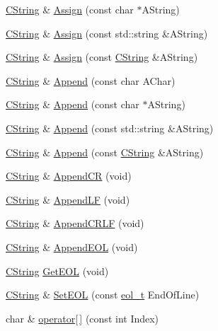 \begin{DoxyCompactItemize}
\item 
\hyperlink{classCString}{C\-String} \& \hyperlink{classCString_a962df2e6c15fdf8017d4bef0304135fd}{Assign} (const char $\ast$A\-String)
\item 
\hyperlink{classCString}{C\-String} \& \hyperlink{classCString_adf1310a3fd1e375b8d9a1ed66cace434}{Assign} (const std\-::string \&A\-String)
\item 
\hyperlink{classCString}{C\-String} \& \hyperlink{classCString_a9f4bad2bf3461011e060a539496149df}{Assign} (const \hyperlink{classCString}{C\-String} \&A\-String)
\item 
\hyperlink{classCString}{C\-String} \& \hyperlink{classCString_aea8e3277a78f2d12eaa1419b223d2e1e}{Append} (const char A\-Char)
\item 
\hyperlink{classCString}{C\-String} \& \hyperlink{classCString_aa163faa52f0615f3a4f6480c53d259b4}{Append} (const char $\ast$A\-String)
\item 
\hyperlink{classCString}{C\-String} \& \hyperlink{classCString_a184ae7089d40bbc8239586e1456ae56d}{Append} (const std\-::string \&A\-String)
\item 
\hyperlink{classCString}{C\-String} \& \hyperlink{classCString_aeb03518bdc70ff7dfeb96b1735ba8e0b}{Append} (const \hyperlink{classCString}{C\-String} \&A\-String)
\item 
\hyperlink{classCString}{C\-String} \& \hyperlink{classCString_a5747e10a27ef61a2daa94c1e6fe40a51}{Append\-C\-R} (void)
\item 
\hyperlink{classCString}{C\-String} \& \hyperlink{classCString_a841b1f0e113e1d186ea5c6312db814e0}{Append\-L\-F} (void)
\item 
\hyperlink{classCString}{C\-String} \& \hyperlink{classCString_ac5822255548b2e55ee6817212f3aaa99}{Append\-C\-R\-L\-F} (void)
\item 
\hyperlink{classCString}{C\-String} \& \hyperlink{classCString_a3cbcdd906974bb7ca593c98716e8e29c}{Append\-E\-O\-L} (void)
\item 
\hyperlink{classCString}{C\-String} \hyperlink{classCString_aa9c60fba2bc1fedfdd1d508ac1a2be5d}{Get\-E\-O\-L} (void)
\item 
\hyperlink{classCString}{C\-String} \& \hyperlink{classCString_a4a3f47681f487614a774c86ab127e2c9}{Set\-E\-O\-L} (const \hyperlink{classCString_aa81e0db1669e13c2a6fd7a28cf60c64f}{eol\-\_\-t} End\-Of\-Line)
\item 
char \& \hyperlink{classCString_a1d74685c9d1458fc43097827dac509a1}{operator\mbox{[}$\,$\mbox{]}} (const int Index)
\item 

\end{DoxyCompactItemize}

